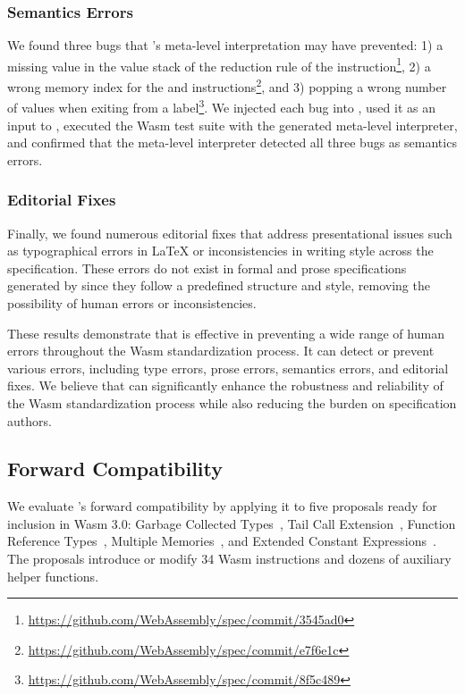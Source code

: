 \subsubsection*{Semantics Errors}
We found three bugs that \dslname's meta-level interpretation may have prevented:
1) a missing value in the value stack of the reduction rule of the 
instruction\footnote{\url{https://github.com/WebAssembly/spec/commit/3545ad0}},
2) a wrong memory index for the 
and 
instructions\footnote{\url{https://github.com/WebAssembly/spec/commit/e7f6e1c}}, and
3) popping a wrong number of values when exiting from
a label\footnote{\url{https://github.com/WebAssembly/spec/commit/8f5c489}}.
We injected each bug into \specdsl, used it as an input to \dslname,
executed the Wasm test suite with the generated meta-level interpreter,
and confirmed that the meta-level interpreter detected all three bugs as semantics errors.

\subsubsection*{Editorial Fixes}
Finally, we found numerous editorial fixes that address presentational issues
such as typographical errors in LaTeX or inconsistencies in writing style across the specification.
These errors do not exist in formal and prose specifications generated by \dslname
since they follow a predefined structure and style,
removing the possibility of human errors or inconsistencies.

\medskip
These results demonstrate that \dslname is effective in preventing a
wide range of human errors throughout the Wasm standardization process.
It can detect or prevent various errors, including type errors, prose errors,
semantics errors, and editorial fixes.
We believe that \dslname can significantly enhance the robustness and
reliability of the Wasm standardization process
while also reducing the burden on specification authors.

\subsection{Forward Compatibility}\label{sec:forward}
We evaluate \dslname's forward compatibility by applying it to
five proposals ready for inclusion in Wasm 3.0:
Garbage Collected Types~\cite{wasm-gc},
Tail Call Extension~\cite{wasm-tce},
Function Reference Types~\cite{wasm-frt},
Multiple Memories~\cite{wasm-mm}, and
Extended Constant Expressions~\cite{wasm-ece}.
The proposals introduce or modify 34 Wasm instructions and
dozens of auxiliary helper functions.

